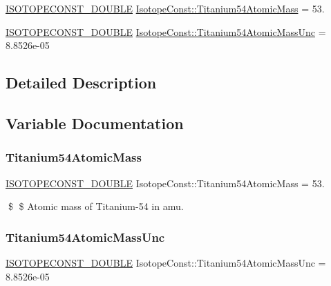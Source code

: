 \begin{DoxyCompactItemize}
\item 
\mbox{\hyperlink{group___isotope_const-_macros_ga8f45a7272ce02c0b4c65c44636ed719a}{I\+S\+O\+T\+O\+P\+E\+C\+O\+N\+S\+T\+\_\+\+D\+O\+U\+B\+LE}} \mbox{\hyperlink{group___isotope_const-_titanium-_ti54_gab6578ef89099d4645f44048e9ad46c4d}{Isotope\+Const\+::\+Titanium54\+Atomic\+Mass}} = 53.
\item 
\mbox{\hyperlink{group___isotope_const-_macros_ga8f45a7272ce02c0b4c65c44636ed719a}{I\+S\+O\+T\+O\+P\+E\+C\+O\+N\+S\+T\+\_\+\+D\+O\+U\+B\+LE}} \mbox{\hyperlink{group___isotope_const-_titanium-_ti54_ga8aecda920a0f3a5bcedb1abf9c6a731a}{Isotope\+Const\+::\+Titanium54\+Atomic\+Mass\+Unc}} = 8.\+8526e-\/05
\end{DoxyCompactItemize}


\subsection{Detailed Description}


\subsection{Variable Documentation}
\mbox{\label{group___isotope_const-_titanium-_ti54_gab6578ef89099d4645f44048e9ad46c4d}} 
\subsubsection{\texorpdfstring{Titanium54\+Atomic\+Mass}{Titanium54AtomicMass}}
{\footnotesize\ttfamily \mbox{\hyperlink{group___isotope_const-_macros_ga8f45a7272ce02c0b4c65c44636ed719a}{I\+S\+O\+T\+O\+P\+E\+C\+O\+N\+S\+T\+\_\+\+D\+O\+U\+B\+LE}} Isotope\+Const\+::\+Titanium54\+Atomic\+Mass = 53.}

\$ \$ Atomic mass of Titanium-\/54 in amu. \mbox{\label{group___isotope_const-_titanium-_ti54_ga8aecda920a0f3a5bcedb1abf9c6a731a}} 
\subsubsection{\texorpdfstring{Titanium54\+Atomic\+Mass\+Unc}{Titanium54AtomicMassUnc}}
{\footnotesize\ttfamily \mbox{\hyperlink{group___isotope_const-_macros_ga8f45a7272ce02c0b4c65c44636ed719a}{I\+S\+O\+T\+O\+P\+E\+C\+O\+N\+S\+T\+\_\+\+D\+O\+U\+B\+LE}} Isotope\+Const\+::\+Titanium54\+Atomic\+Mass\+Unc = 8.\+8526e-\/05}

